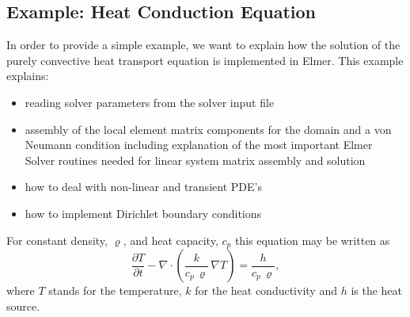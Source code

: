 \subsection{Example: Heat Conduction Equation}\label{programming:example_heat}
In order to provide a simple example, we want to explain how the solution of the purely convective heat transport equation is implemented in Elmer. This example explains:
\begin{itemize}
\item reading solver parameters from the solver input file
\item assembly of the local element matrix components for the domain and a von Neumann condition including explanation of the most important Elmer Solver routines needed for linear system matrix assembly and solution
\item how to deal with non-linear and transient PDE's
\item how to implement Dirichlet boundary conditions
\end{itemize}
For constant density, $\varrho$, and heat capacity, $c_{p}$  this equation may be written as
\begin{equation}\label{programming:heat}
\frac{\partial T}{\partial t} - \nabla\cdot(\frac{k}{c_{p}\,\varrho}\,\nabla T) = \frac{h}{c_{p}\,\varrho},
\end{equation}
where $T$ stands for the temperature, $k$ for the heat conductivity and $h$ is the heat source.


